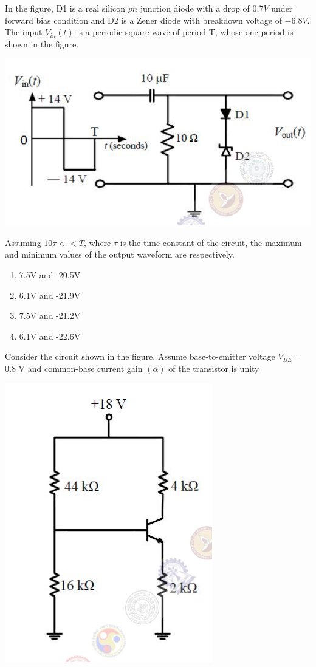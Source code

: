 \item In the figure, D1 is a real silicon $pn$ junction diode with a drop of $0.7V$ under forward bias condition and D2 is a Zener diode with breakdown voltage of $-6.8 V$. The input $ V_{in}(t)$ is a periodic square wave of period T, whose one period is shown in the figure.

\includegraphics[scale=0.3]{13}

Assuming $10\tau << T$, where $\tau$ is the time constant of the circuit, the maximum and minimum values of the output waveform are respectively.
\begin{enumerate}
\item 7.5V and -20.5V
\item 6.1V and -21.9V
\item 7.5V and -21.2V 
\item 6.1V and -22.6V
\end{enumerate}

\item Consider the circuit shown in the figure. Assume base-to-emitter voltage $ V_{BE}$ = 0.8 V and common-base current gain $(\alpha)$ of the transistor is unity 

\includegraphics[scale=0.5]{14}

